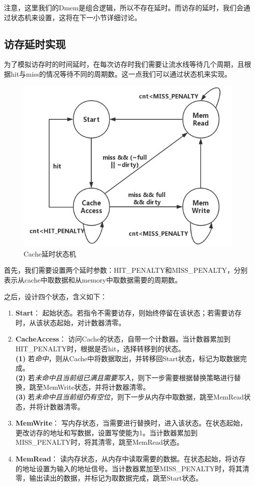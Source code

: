 \documentclass[12pt]{article} %
\begin{document}
\begin{sloppypar}
注意，这里我们的Dmem是组合逻辑，所以不存在延时。而访存的延时，我们会通过状态机来设置，这将在下一小节详细讨论。

\subsection{访存延时实现}

为了模拟访存时的时间延时，在每次访存时我们需要让流水线等待几个周期，且根据hit与miss的情况等待不同的周期数。这一点我们可以通过状态机来实现。
\begin{figure}[h]
\centering
\includegraphics[width = 0.7\linewidth]{figure/state.jpg}
\caption{Cache延时状态机}
\end{figure}

首先，我们需要设置两个延时参数：HIT\_PENALTY和MISS\_PENALTY，分别表示从cache中取数据和从memory中取数据需要的周期数。

之后，设计四个状态，含义如下：
\begin{enumerate}
\item {\bf Start}： 起始状态。若指令不需要访存，则始终停留在该状态；若需要访存时，从该状态起始，对计数器清零。
\item {\bf CacheAccess}： 访问Cache的状态，自带一个计数器。当计数器累加到HIT\_PENALTY时，根据是否hit，选择转移到的状态。\\
{\bf (1)} 若{\em 命中}，则从Cache中将数据取出，并转移回Start状态，标记为取数据完成。\\
{\bf (2)} 若{\em 未命中且当前组已满且需要写入}，则下一步需要根据替换策略进行替换，跳至MemWrite状态，并将计数器清零。\\
{\bf (3)} 若{\em 未命中且当前组仍有空位}，则下一步从内存中取数据，跳至MemRead状态，并将计数器清零。
\item {\bf MemWrite}： 写内存状态，当需要进行替换时，进入该状态。在状态起始，更改访存的地址和写数据，设置写使能为1。当计数器累加到MISS\_PENALTY时，将其清零，跳至MemRead状态。
\item {\bf MemRead}： 读内存状态，从内存中读取需要的数据。在状态起始，将访存的地址设置为输入的地址信号。当计数器累加至MISS\_PENALTY时，将其清零，输出读出的数据，并标记为取数据完成，跳至Start状态。
\end{enumerate}


\end{sloppypar}
\end{document}
